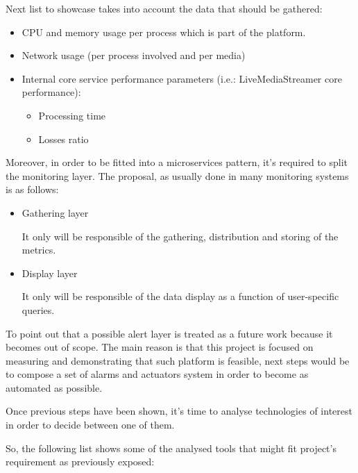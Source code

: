 Next list to showcase takes into account the data that should be gathered:

\begin{itemize}
\item CPU and memory usage per process which is part of the platform.
\item Network usage (per process involved and per media)
\item Internal core service performance parameters (i.e.: LiveMediaStreamer core performance):
\begin{itemize}
\item Processing time
\item Losses ratio
\end{itemize}
\end{itemize}

Moreover, in order to be fitted into a microservices pattern, it's required to split the monitoring layer. The proposal, as usually done in many monitoring systems is as follows:
\begin{itemize}
\item Gathering layer \hfill

It only will be responsible of the gathering, distribution and storing of the metrics.

\item Display layer

It only will be responsible of the data display as a function of user-specific queries.

\end{itemize}
To point out that a possible alert layer is treated as a future work because it becomes out of scope. The main reason is that this project is focused on measuring and demonstrating that such platform is feasible, next steps would be to compose a set of alarms and actuators system in order to become as automated as possible.

Once previous steps have been shown, it's time to analyse technologies of interest in order to decide between one of them.

So, the following list shows some of the analysed tools that might fit project's requirement as previously exposed:

